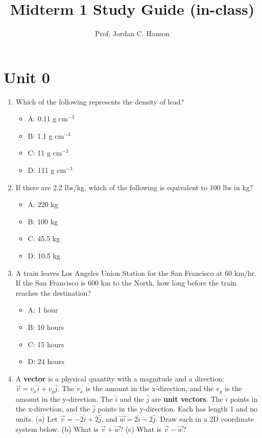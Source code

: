 \documentclass{article}
\begin{document}
\twocolumn

\title{Midterm 1 Study Guide (in-class)}
\author{Prof. Jordan C. Hanson}

\maketitle

\section{Unit 0}

\begin{enumerate}
\item Which of the following represents the density of lead?
\begin{itemize}
\item A: 0.11 g cm$^{-3}$
\item B: 1.1 g cm$^{-3}$
\item C: 11 g cm$^{-3}$
\item D: 111 g cm$^{-3}$
\end{itemize}

\item If there are 2.2 lbs/kg, which of the following is equivalent to 100 lbs in kg?
\begin{itemize}
\item A: 220 kg
\item B: 100 kg
\item C: 45.5 kg
\item D: 10.5 kg
\end{itemize}

\item A train leaves Los Angeles Union Station for the San Francisco at 60 km/hr.  If the San Francisco is 600 km to the North, how long before the train reaches the destination?
\begin{itemize}
\item A: 1 hour
\item B: 10 hours
\item C: 15 hours
\item D: 24 hours
\end{itemize}

\item A \textbf{vector} is a physical quantity with a magnitude and a direction: $\vec{v} = v_x \hat{i} + v_y \hat{j}$.  The $v_x$ is the amount in the x-direction, and the $v_y$ is the amount in the y-direction.  The $\hat{i}$ and the $\hat{j}$ are \textbf{unit vectors}.  The $\hat{i}$ points in the x-direction, and the $\hat{j}$ points in the y-direction.  Each has length 1 and no units. (a) Let $\vec{v} = -2\hat{i} + 2\hat{j}$, and $\vec{w} = 2\hat{i} - 2\hat{j}$.  Draw each in a 2D coordinate system below. (b) What is $\vec{v} + \vec{w}$?  (c) What is $\vec{v} - \vec{w}$? \\ \vspace{3cm}


\end{enumerate}
\end{document}
